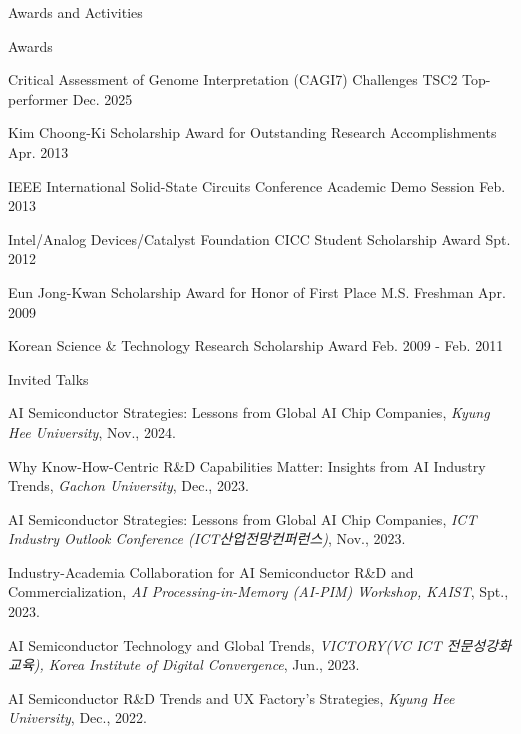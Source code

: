 \documentclass{resume} %
\newcommand{\ko}[1]{{\upshape\koreanfont #1}}
\begin{document}
\begin{section}{Awards and Activities}

\begin{subsection}{Awards}{}{}{}
\item Critical Assessment of Genome Interpretation (CAGI7) Challenges TSC2 Top-performer \hfill Dec. 2025
\item Kim Choong-Ki Scholarship Award for Outstanding Research Accomplishments \hfill Apr. 2013
\item IEEE International Solid-State Circuits Conference Academic Demo Session \hfill Feb. 2013
\item Intel/Analog Devices/Catalyst Foundation CICC Student Scholarship Award \hfill Spt. 2012
\item Eun Jong-Kwan Scholarship Award for Honor of First Place M.S. Freshman \hfill Apr. 2009
\item Korean Science \& Technology Research Scholarship Award \hfill Feb. 2009 - Feb. 2011
\end{subsection}

\begin{subsection}{Invited Talks}{}{}{}

\item AI Semiconductor Strategies: Lessons from Global AI Chip Companies,
{\small\textit{Kyung Hee University}, Nov., 2024.}

\item Why Know-How-Centric R\&D Capabilities Matter: Insights from AI Industry Trends,
{\small\textit{Gachon University}, Dec., 2023.}

\item AI Semiconductor Strategies: Lessons from Global AI Chip Companies,
{\small\textit{ICT Industry Outlook Conference (ICT\ko{산업전망컨퍼런스})}, Nov., 2023.}

\item Industry-Academia Collaboration for AI Semiconductor R\&D and Commercialization,
{\small\textit{AI Processing-in-Memory (AI-PIM) Workshop, KAIST}, Spt., 2023.}

\item AI Semiconductor Technology and Global Trends,
{\small\textit{VICTORY(VC ICT \ko{전문성강화교육}), Korea Institute of Digital Convergence}, Jun., 2023.}

\item AI Semiconductor R\&D Trends and UX Factory's Strategies,
{\small\textit{Kyung Hee University}, Dec., 2022.}


\end{subsection}
\end{section}
\end{document}
